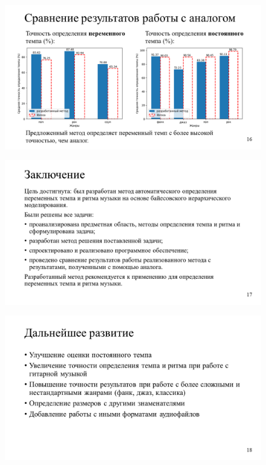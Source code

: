 \begin{figure}[h!]
	\begin{center}
		\includegraphics[angle=90,scale=0.75]{slides/Slide16.png}
	\end{center}
\end{figure}

\begin{figure}[h!]
	\begin{center}
		\includegraphics[angle=90,scale=0.75]{slides/Slide17.png}
	\end{center}
\end{figure}

\begin{figure}[h!]
	\begin{center}
		\includegraphics[angle=90,scale=0.75]{slides/Slide18.png}
	\end{center}
\end{figure}